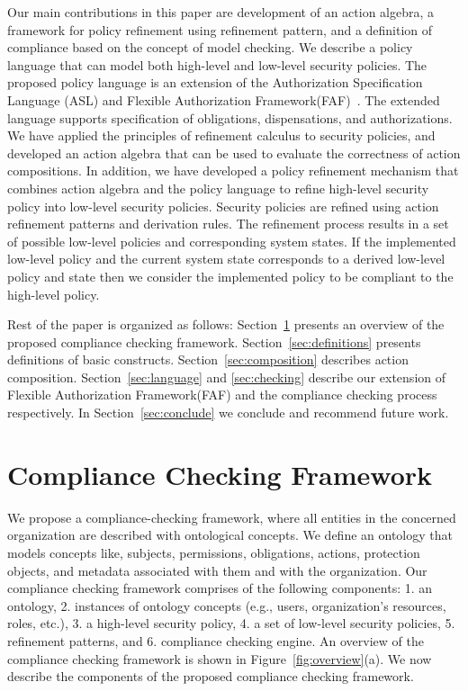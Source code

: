 \documentclass[12pt,journal,letterpaper,onecolumn]{IEEEtran}
\begin{document}
Our main contributions in this paper are development of an action
algebra, a framework for policy refinement using refinement pattern,
and a definition of compliance based on the concept of model checking.
We describe a policy language that can model both high-level and low-level
security policies. The proposed policy language is an extension of
the Authorization Specification Language (ASL) and Flexible
Authorization Framework(FAF)~\cite{Jajodia01}. The
extended language supports specification of obligations,
dispensations, and authorizations. We have applied the principles of
refinement calculus to security policies, and developed an
action algebra that can be used to evaluate the correctness of
action compositions.  In addition, we have developed a policy
refinement mechanism that combines action algebra and the policy
language to refine high-level security policy into low-level
security policies. Security policies are refined using action
refinement patterns and derivation rules. The refinement process
results in a set of possible low-level policies and corresponding
system states. If the implemented low-level policy and the current
system state corresponds to a derived low-level policy and state
then we consider the implemented policy to be compliant to the
high-level policy.


Rest of the paper is organized as follows:
Section~\ref{sec:overview} presents an overview of the proposed
compliance checking framework. Section~\ref{sec:definitions}
presents definitions of basic constructs.
Section~\ref{sec:composition} describes action composition.
Section~\ref{sec:language} and \ref{sec:checking} describe our
extension of Flexible Authorization Framework(FAF) and the compliance checking process respectively.
In Section~\ref{sec:conclude} we conclude and recommend future work.



\section{Compliance Checking Framework}
\label{sec:overview}

We propose a compliance-checking framework, where all entities in
the concerned organization are described with ontological concepts.
We define an ontology that models concepts like, subjects,
permissions, obligations, actions, protection objects, and metadata
associated with them and with the organization. Our compliance
checking framework comprises of the following components: 1. an
ontology, 2. instances of ontology concepts (e.g., users,
organization's resources, roles, etc.), 3. a high-level security
policy, 4. a set of low-level security policies, 5. refinement
patterns, and 6. compliance checking engine. An overview of the
compliance checking framework is shown in Figure~\ref{fig:overview}(a).
We now describe the components of the proposed compliance checking
framework.
\end{document}
